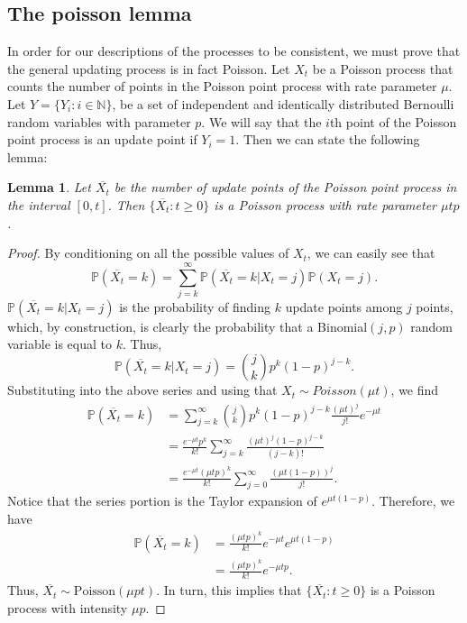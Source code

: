\documentclass[notitlepage,reqno]{amsart}
\newcommand{\pr}{\mathbb{P}}
\newtheorem{lem}{Lemma}
\begin{document}
\subsection{The poisson lemma}
In order for our descriptions of the processes to be consistent, we must
prove that the general updating process is in fact Poisson. Let $X_t$ be a Poisson process that counts the number of
points in the Poisson point process with rate parameter $\mu$. Let
$Y = \{Y_i: i\in\mathbb{N}\}$, be a set of independent and identically
distributed Bernoulli random variables with parameter $p$. We will say
that the $i$th point of the Poisson point process is an update point
if $Y_i = 1$. 
Then we can state the following lemma:
\begin{lem}
Let $\overline{X_t}$ be the number of update points of
the Poisson point process in the interval $[0,t]$. Then $\{\overline{X_t} : t\geq
0\}$ is a Poisson process with rate parameter $\mu t p$.
\end{lem}
\begin{proof}
By conditioning on all the possible values of $X_t$, we can easily see that
\[
    \pr(\overline{X_t} = k) = \sum_{j=k}^\infty \pr(\overline{X_t}=k |
    X_t = j)\pr(X_t=j).
\]
$\pr(\overline{X_t}=k|X_t=j)$ is
the probability of finding $k$ update points among $j$ points, which,
by construction, is clearly the probability that a Binomial$(j,p)$
random variable is equal to $k$. Thus,
\[
    \pr(\overline{X_t}=k|X_t=j) = {j\choose k} p^k (1-p)^{j-k}.
\]
Substituting into the above series and using that $X_t\sim Poisson(\mu
t)$, we find
\begin{align*}
    \pr(\overline{X_t} = k) &= \sum_{j=k}^\infty {j\choose k}
    p^k(1-p)^{j-k} \frac{(\mu t)^j}{j!} e^{-\mu t} \\
    &= \frac{e^{-\mu t} p^k}{k!} \sum_{j=k}^\infty \frac{(\mu t)^j
      (1-p)^{j-k}}{(j-k)!} \\
    &= \frac{e^{-\mu t} (\mu t p)^k}{k!} \sum_{j=0}^\infty \frac{(\mu t(1-p))^j}{j!}.
\end{align*}
Notice that the series portion is the Taylor expansion of $e^{\mu t
  (1-p)}$. Therefore, we have
\begin{align*}
    \pr(\overline{X_t}=k) &= \frac{(\mu t p)^k}{k!} e^{-\mu t}e^{\mu t
      (1-p)} \\
    &= \frac{(\mu t p)^k}{k!} e^{-\mu t p}.
\end{align*}
Thus, $\overline{X_t} \sim \text{Poisson}(\mu p t)$. In turn, this
implies that $\{\overline{X_t} : t\geq 0\}$ is a Poisson process with
intensity $\mu p$.
\end{proof}
\end{document}
